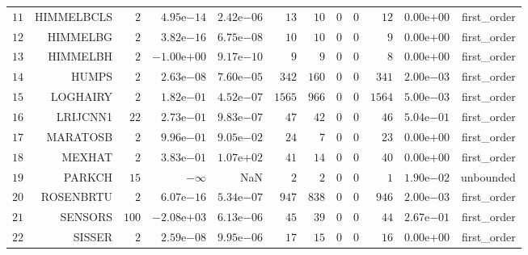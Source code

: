 \begin{longtable}{rrrrrrrrrrrr}
  \(    11\) & HIMMELBCLS & \(     2\) & \( 4.95\)e\(-14\) & \( 2.42\)e\(-06\) & \(    13\) & \(    10\) & \(     0\) & \(     0\) & \(    12\) & \( 0.00\)e\(+00\) & first\_order \\
  \(    12\) & HIMMELBG & \(     2\) & \( 3.82\)e\(-16\) & \( 6.75\)e\(-08\) & \(    10\) & \(    10\) & \(     0\) & \(     0\) & \(     9\) & \( 0.00\)e\(+00\) & first\_order \\
  \(    13\) & HIMMELBH & \(     2\) & \(-1.00\)e\(+00\) & \( 9.17\)e\(-10\) & \(     9\) & \(     9\) & \(     0\) & \(     0\) & \(     8\) & \( 0.00\)e\(+00\) & first\_order \\
  \(    14\) & HUMPS & \(     2\) & \( 2.63\)e\(-08\) & \( 7.60\)e\(-05\) & \(   342\) & \(   160\) & \(     0\) & \(     0\) & \(   341\) & \( 2.00\)e\(-03\) & first\_order \\
  \(    15\) & LOGHAIRY & \(     2\) & \( 1.82\)e\(-01\) & \( 4.52\)e\(-07\) & \(  1565\) & \(   966\) & \(     0\) & \(     0\) & \(  1564\) & \( 5.00\)e\(-03\) & first\_order \\
  \(    16\) & LRIJCNN1 & \(    22\) & \( 2.73\)e\(-01\) & \( 9.83\)e\(-07\) & \(    47\) & \(    42\) & \(     0\) & \(     0\) & \(    46\) & \( 5.04\)e\(-01\) & first\_order \\
  \(    17\) & MARATOSB & \(     2\) & \( 9.96\)e\(-01\) & \( 9.05\)e\(-02\) & \(    24\) & \(     7\) & \(     0\) & \(     0\) & \(    23\) & \( 0.00\)e\(+00\) & first\_order \\
  \(    18\) & MEXHAT & \(     2\) & \( 3.83\)e\(-01\) & \( 1.07\)e\(+02\) & \(    41\) & \(    14\) & \(     0\) & \(     0\) & \(    40\) & \( 0.00\)e\(+00\) & first\_order \\
  \(    19\) & PARKCH & \(    15\) & \(-\infty\) &       NaN & \(     2\) & \(     2\) & \(     0\) & \(     0\) & \(     1\) & \( 1.90\)e\(-02\) & unbounded \\
  \(    20\) & ROSENBRTU & \(     2\) & \( 6.07\)e\(-16\) & \( 5.34\)e\(-07\) & \(   947\) & \(   838\) & \(     0\) & \(     0\) & \(   946\) & \( 2.00\)e\(-03\) & first\_order \\
  \(    21\) & SENSORS & \(   100\) & \(-2.08\)e\(+03\) & \( 6.13\)e\(-06\) & \(    45\) & \(    39\) & \(     0\) & \(     0\) & \(    44\) & \( 2.67\)e\(-01\) & first\_order \\
  \(    22\) & SISSER & \(     2\) & \( 2.59\)e\(-08\) & \( 9.95\)e\(-06\) & \(    17\) & \(    15\) & \(     0\) & \(     0\) & \(    16\) & \( 0.00\)e\(+00\) & first\_order \\

\end{longtable}
